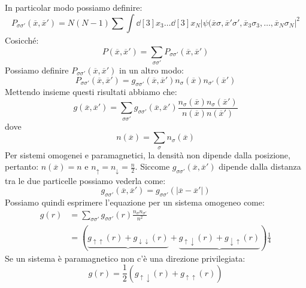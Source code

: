 In particolar modo possiamo definire:
\begin{equation*}
    P_{\sigma\sigma'}(\overline x, \overline{x}')=N(N-1)\sum_{}\int \dd[3]{x_3}\dots\dd[3]{x_N}|\psi(\overline x \sigma, \overline{x}'\sigma', \overline{x}_3\sigma_3,\dots,\overline{x}_N\sigma_N|^2
\end{equation*}
Cosicché:
\begin{equation*}
    P(\overline x, \overline{x}')=\sum_{\sigma \sigma'}P_{\sigma\sigma'}(\overline x, \overline{x}')
\end{equation*}
Possiamo definire $P_{\sigma\sigma'}(\overline x, \overline{x}')$ in un altro modo:
\begin{equation*}
    P_{\sigma\sigma'}(\overline x, \overline{x}')=g_{\sigma\sigma'}(\overline{x}, \overline{x}')n_\sigma(\overline x)n_{\sigma'}(\overline{x}')
\end{equation*}
Mettendo insieme questi risultati abbiamo che:
\begin{equation*}
    g(\overline x, \overline{x}')=\sum_{\sigma \sigma'}g_{\sigma\sigma'}(\overline x, \overline{x}')\frac{n_\sigma(\overline x)n_\sigma(\overline{x}')}{n(\overline x)n(\overline{x}')}
\end{equation*}
dove
\begin{equation*}
    n(\overline x)=\sum_\sigma n_\sigma(\overline x)
\end{equation*}
Per sistemi omogenei e paramagnetici, la densità non dipende dalla posizione, pertanto: $n(\overline x)=n$ e $n_\uparrow=n_\downarrow=\frac n2$.
Siccome $g_{\sigma\sigma'}(\overline x, \overline{x}')$ dipende dalla distanza tra le due particelle possiamo vederla come:
\begin{equation*}
    g_{\sigma\sigma'}(\overline x, \overline{x}')=g_{\sigma\sigma'}(|\overline x- \overline x'|)
\end{equation*}
Possiamo quindi esprimere l'equazione per un sistema omogeneo come:
\begin{equation*}
    \begin{aligned}
    g(r) & =\sum_{\sigma\sigma'}g_{\sigma\sigma'}(r)\frac{n_\sigma n_{\sigma'}}{n^2} \\
        & = (\underbrace{g_{\uparrow\uparrow}(r)+g_{\downarrow\downarrow}(r)}+\underbrace{g_{\uparrow\downarrow}(r)+g_{\downarrow\uparrow}(r)})\frac 14
    \end{aligned}
\end{equation*}
Se un sistema è paramagnetico non c'è una direzione privilegiata:
\begin{equation*}
    g(r)=\frac 12(g_{\uparrow\downarrow}(r)+g_{\uparrow\uparrow}(r))
\end{equation*}
